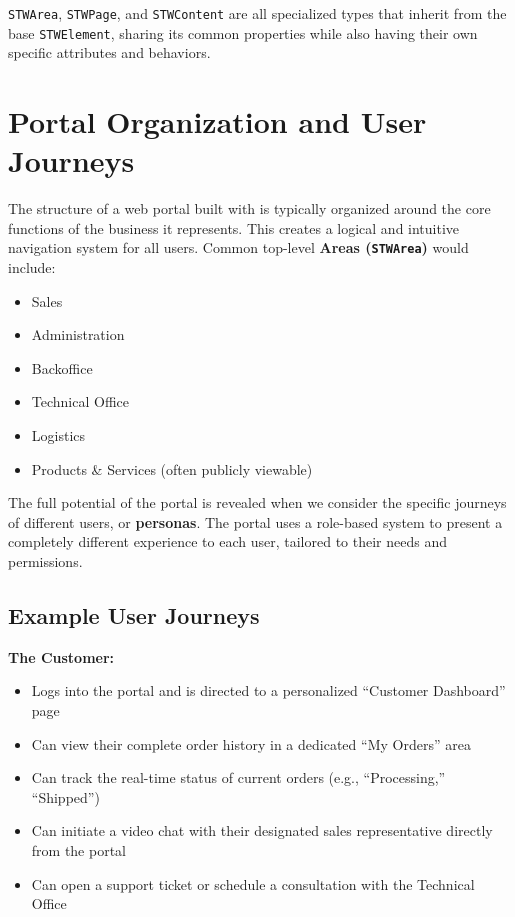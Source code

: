 \texttt{STWArea}, \texttt{STWPage}, and \texttt{STWContent} are all specialized types that inherit from the base \texttt{STWElement}, sharing its common properties while also having their own specific attributes and behaviors.

\section{Portal Organization and User Journeys}
\label{sec:user-journeys}

The structure of a web portal built with \wbdl{} is typically organized around the core functions of the business it represents. This creates a logical and intuitive navigation system for all users. Common top-level \textbf{Areas (\texttt{STWArea})} would include:

\begin{itemize}
    \item Sales
    \item Administration
    \item Backoffice
    \item Technical Office
    \item Logistics
    \item Products \& Services (often publicly viewable)
\end{itemize}

The full potential of the portal is revealed when we consider the specific journeys of different users, or \textbf{personas}. The portal uses a role-based system to present a completely different experience to each user, tailored to their needs and permissions.

\subsection{Example User Journeys}

\textbf{The Customer:}
\begin{itemize}
    \item Logs into the portal and is directed to a personalized ``Customer Dashboard'' page
    \item Can view their complete order history in a dedicated ``My Orders'' area
    \item Can track the real-time status of current orders (e.g., ``Processing,'' ``Shipped'')
    \item Can initiate a video chat with their designated sales representative directly from the portal
    \item Can open a support ticket or schedule a consultation with the Technical Office
\end{itemize}

